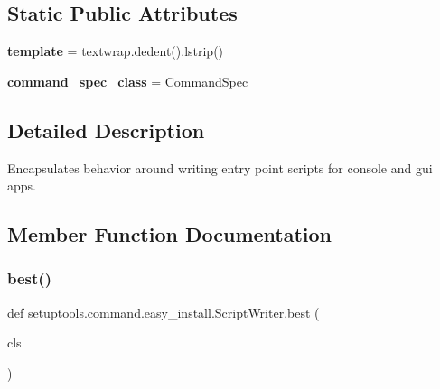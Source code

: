 \subsection*{Static Public Attributes}
\begin{DoxyCompactItemize}
\item 
\mbox{\label{classsetuptools_1_1command_1_1easy__install_1_1_script_writer_add87ac1a8190275eb8e549a38aa3763b}} 
{\bfseries template} = textwrap.\+dedent().lstrip()
\item 
\mbox{\label{classsetuptools_1_1command_1_1easy__install_1_1_script_writer_ac4fc67e6673d774cd6af71b6eb982eb9}} 
{\bfseries command\+\_\+spec\+\_\+class} = \hyperlink{classsetuptools_1_1command_1_1easy__install_1_1_command_spec}{Command\+Spec}
\end{DoxyCompactItemize}


\subsection{Detailed Description}
\begin{DoxyVerb}Encapsulates behavior around writing entry point scripts for console and
gui apps.
\end{DoxyVerb}
 

\subsection{Member Function Documentation}
\mbox{\label{classsetuptools_1_1command_1_1easy__install_1_1_script_writer_a1eae4e5243b93a8dd44ec91b0f4987f4}} 
\subsubsection{\texorpdfstring{best()}{best()}}
{\footnotesize\ttfamily def setuptools.\+command.\+easy\+\_\+install.\+Script\+Writer.\+best (\begin{DoxyParamCaption}\item[{}]{cls }\end{DoxyParamCaption})}

